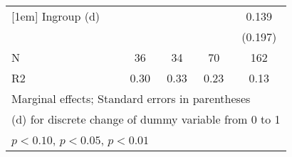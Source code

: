 {\begin{tabular}{l*{4}{c}}
[1em]
Ingroup (d)         &                     &                     &                     &       0.139         \\
                    &                     &                     &                     &     (0.197)         \\
\hline
N                   &          36         &          34         &          70         &         162         \\
R2                  &        0.30         &        0.33         &        0.23         &        0.13         \\
\hline\hline
\multicolumn{5}{l}{\footnotesize Marginal effects; Standard errors in parentheses}\\
\multicolumn{5}{l}{\footnotesize  (d) for discrete change of dummy variable from 0 to 1}\\
\multicolumn{5}{l}{\footnotesize \sym{*} \(p<0.10\), \sym{**} \(p<0.05\), \sym{***} \(p<0.01\)}\\
\end{tabular}
}

